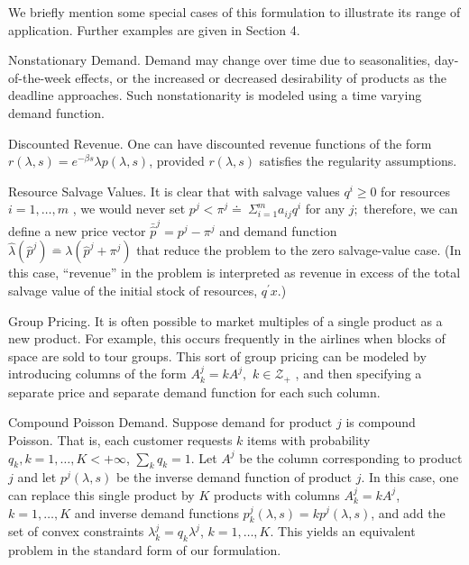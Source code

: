 We briefly mention some special cases of this formulation to illustrate its range of application. Further examples are given in Section 4.

Nonstationary Demand. Demand may change over time due to seasonalities, day-of-the-week effects, or the increased or decreased desirability of products as the deadline approaches. Such nonstationarity is modeled using a time varying demand function.

Discounted Revenue. One can have discounted revenue functions of the form \(r ( \lambda , s ) = e ^ { - \beta s } \lambda p ( \lambda , s )\), provided \(r ( \lambda , s )\) satisfies the regularity assumptions.

Resource Salvage Values. It is clear that with salvage values \(q ^ { i } \geqslant 0\) for resources \(i = 1 , \ldots , m\) , we would never set \(p ^ { j } < \pi ^ { j } \doteq \ \Sigma _ { i = 1 } ^ { m } a _ { i j } q ^ { i }\) for any \(j ;\) therefore, we can define a new price vector \(\bar { \hat { p } } ^ { j } = p ^ { j } - \pi ^ { j }\) and demand function \(\hat { \lambda } ( \hat { p } ^ { j } ) \stackrel { - } { = } \lambda ( \hat { p } ^ { j } + \pi ^ { j } )\) that reduce the problem to the zero salvage-value case. (In this case, ``revenue'' in the problem is interpreted as revenue in excess of the total salvage value of the initial stock of resources, \(q ^ { \prime } x\).)

Group Pricing. It is often possible to market multiples of a single product as a new product. For example, this occurs frequently in the airlines when blocks of space are sold to tour groups. This sort of group pricing can be modeled by introducing columns of the form \(A _ { k } ^ { j } = k A ^ { j } ,\) \(k \in \mathcal { Z } _ { + }\) , and then specifying a separate price and separate demand function for each such column.

Compound Poisson Demand. Suppose demand for product \(j\) is compound Poisson. That is, each customer requests \(k\) items with probability \(q _ { k } , k = 1 , \ldots , K < + \infty\), \(\sum _ { k } q _ { k } = 1\). Let \(A ^ { j }\) be the column corresponding to product \(j\) and let \(p ^ { j } ( \lambda , s )\) be the inverse demand function of product \(j\). In this case, one can replace this single product by \(K\) products with columns \(A _ { k } ^ { j } = k A ^ { j }\), \(k = 1 , \dots , K\) and inverse demand functions \(p _ { k } ^ { j } ( \lambda , s ) = k p ^ { j } ( \lambda , s )\), and add the set of convex constraints \(\lambda _ { k } ^ { j } = q _ { k } \lambda ^ { j }\), \(k = 1 , \ldots , K\). This yields an equivalent problem in the standard form of our formulation.

